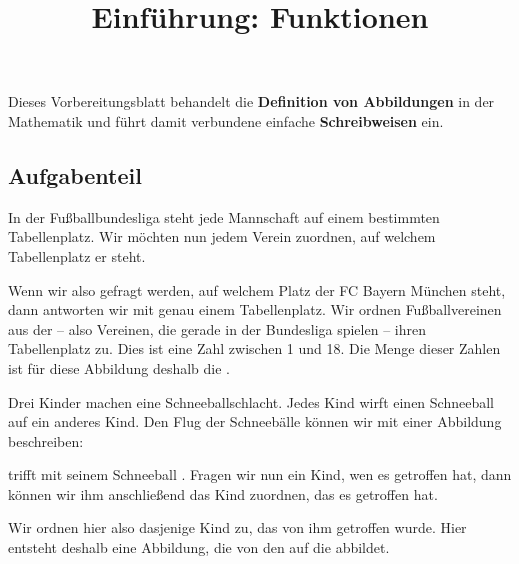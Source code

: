 \documentclass[]{uebungsblatt}
\title{Einführung: Funktionen}
\begin{document}
\maketitle
\begin{contents}
    Dieses Vorbereitungsblatt behandelt die \textbf{Definition von Abbildungen} in der Mathematik und
    führt damit verbundene einfache \textbf{Schreibweisen} ein.
\end{contents}


\subsection*{Aufgabenteil}
\begin{exercise}
    In der Fußballbundesliga steht jede Mannschaft auf einem bestimmten Tabellenplatz. Wir möchten nun jedem Verein zuordnen, auf welchem Tabellenplatz er steht.
        
    Wenn wir also gefragt werden, auf welchem Platz der FC Bayern München steht, dann antworten wir mit genau einem Tabellenplatz.
    Wir ordnen Fußballvereinen aus der  -- also Vereinen, die gerade in der Bundesliga spielen -- ihren Tabellenplatz zu.
    Dies ist eine Zahl zwischen 1 und 18. Die Menge dieser Zahlen ist für diese Abbildung deshalb die .
\end{exercise}

\begin{exercise}
    Drei Kinder machen eine Schneeballschlacht. Jedes Kind wirft einen Schneeball auf ein anderes Kind. Den Flug der Schneebälle können wir mit einer Abbildung beschreiben:
        
     trifft mit seinem Schneeball . Fragen wir nun ein Kind, wen es getroffen hat, dann können wir ihm anschließend das Kind zuordnen, das es getroffen hat.
        
    Wir ordnen hier also  dasjenige Kind zu, das von ihm getroffen wurde. Hier entsteht deshalb eine Abbildung, die von den  auf die  abbildet.
\end{exercise}
\end{document}
